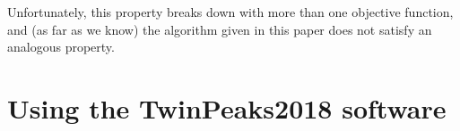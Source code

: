 \documentclass[entropy,article,submit,moreauthors,pdftex,10pt,a4paper]{Definitions/mdpi}
\begin{document}
Unfortunately, this property breaks down with more than
one objective function, and (as far as we know) the algorithm given in this
paper does not satisfy an analogous property.

\section{Using the TwinPeaks2018 software}\label{sec:software}






%



%



\end{document}
